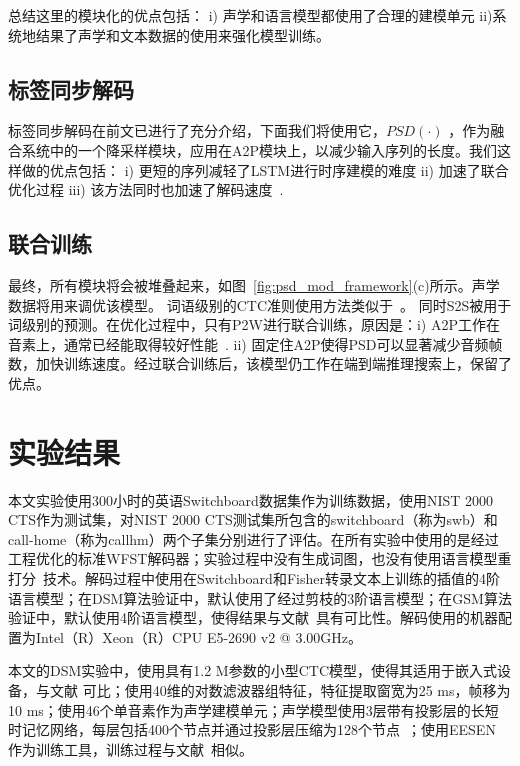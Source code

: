 总结这里的模块化的优点包括： i) 声学和语言模型都使用了合理的建模单元 ii)系统地结果了声学和文本数据的使用来强化模型训练。


\subsection{标签同步解码}
\label{sec:psd_mod_psd}
标签同步解码在前文已进行了充分介绍，下面我们将使用它，$PSD(\cdot)$ ，作为融合系统中的一个降采样模块，应用在A2P模块上，以减少输入序列的长度。我们这样做的优点包括： i) 更短的序列减轻了LSTM进行时序建模的难度 ii)  加速了联合优化过程 iii) 该方法同时也加速了解码速度~\cite{zhc00-chen-tasl2017}.


\subsection{联合训练}
\label{sec:psd_mod_joint}
最终，所有模块将会被堆叠起来，如图~\ref{fig:psd_mod_framework}(c)所示。声学数据将用来调优该模型。
词语级别的CTC准则使用方法类似于~\cite{soltau2016neural}。
同时S2S被用于词级别的预测。在优化过程中，只有P2W进行联合训练，原因是：i) A2P工作在音素上，通常已经能取得较好性能~\cite{miao2015eesen,sak2015fast}. ii) 固定住A2P使得PSD可以显著减少音频帧数，加快训练速度。经过联合训练后，该模型仍工作在端到端推理搜索上，保留了优点。
%


\section{实验结果}
\label{chap:lsd-exp}

本文实验使用300小时的英语Switchboard数据集作为训练数据\cite{godfrey1992switchboard}，使用NIST 2000 CTS作为测试集，对NIST 2000 CTS测试集所包含的switchboard（称为swb）和call-home（称为callhm）两个子集分别进行了评估。在所有实验中使用的是经过工程优化的标准WFST解码器；实验过程中没有生成词图，也没有使用语言模型重打分~\cite{povey2012generating}技术。解码过程中使用在Switchboard和Fisher转录文本上训练的插值的4阶语言模型；在DSM算法验证中，默认使用了经过剪枝的3阶语言模型；在GSM算法验证中，默认使用4阶语言模型，使得结果与文献~\cite{povey2016purely}具有可比性。解码使用的机器配置为Intel（R）Xeon（R）CPU E5-2690 v2 @ 3.00GHz。

本文的DSM实验中，使用具有1.2 M参数的小型CTC模型，使得其适用于嵌入式设备，与文献 \cite{mcgraw2016personalized}可比；使用40维的对数滤波器组特征，特征提取窗宽为25 ms，帧移为10 ms；使用46个单音素作为声学建模单元；声学模型使用3层带有投影层的长短时记忆网络，每层包括400个节点并通过投影层压缩为128个节点~\cite{sak2014long}；使用EESEN \cite{miao2016ctc}作为训练工具，训练过程与文献~\cite{miao2015eesen}相似。

